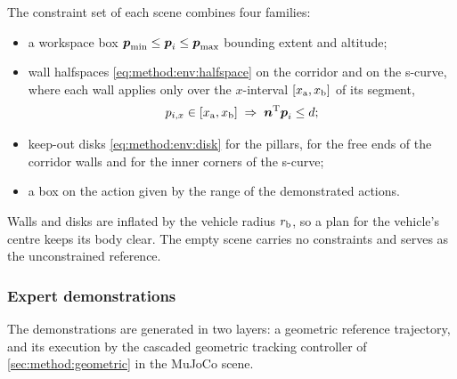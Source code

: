 The constraint set of each scene combines four families:
\begin{itemize}
  \item a workspace box $\boldsymbol{p}_{\textrm{min}}\le\boldsymbol{p}_{i}\le\boldsymbol{p}_{\textrm{max}}$ bounding extent and
    altitude;
  \item wall halfspaces \eqref{eq:method:env:halfspace} on the corridor and on the s-curve, where each
    wall applies only over the $x$-interval $[x_{\textrm{a}},x_{\textrm{b}}]$ of its segment,
    \begin{equation}\label{eq:method:env:switched}
      p_{i,x}\in[x_{\textrm{a}},x_{\textrm{b}}] \;\Rightarrow\; \boldsymbol{n}^{\textrm{T}}\boldsymbol{p}_{i} \le d ;
    \end{equation}
  \item keep-out disks \eqref{eq:method:env:disk} for the pillars, for the free ends of the corridor
    walls and for the inner corners of the s-curve;
  \item a box on the action given by the range of the demonstrated actions.
\end{itemize}
Walls and disks are inflated by the vehicle radius $r_{\textrm{b}}$, so a plan for the vehicle's centre keeps
its body clear. The empty scene carries no constraints and serves as the unconstrained reference.

\subsubsection*{Expert demonstrations}

The demonstrations are generated in two layers: a geometric reference trajectory, and its execution
by the cascaded geometric tracking controller of \autoref{sec:method:geometric} in the MuJoCo scene.


